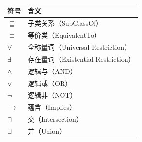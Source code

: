 \begin{center}
\begin{tabular}{@{}ll@{}}
\toprule
\textbf{符号} & \textbf{含义} \\
\midrule
\(\sqsubseteq\) & 子类关系（SubClassOf） \\
\(\equiv\) & 等价类（EquivalentTo） \\
\(\forall\) & 全称量词（Universal Restriction） \\
\(\exists\) & 存在量词（Existential Restriction） \\
\(\land\) & 逻辑与（AND） \\
\(\lor\) & 逻辑或（OR） \\
\(\lnot\) & 逻辑非（NOT） \\
\(\rightarrow\) & 蕴含（Implies） \\
\(\sqcap\) & 交（Intersection） \\
\(\sqcup\) & 并（Union） \\
\bottomrule
\end{tabular}
\end{center}
